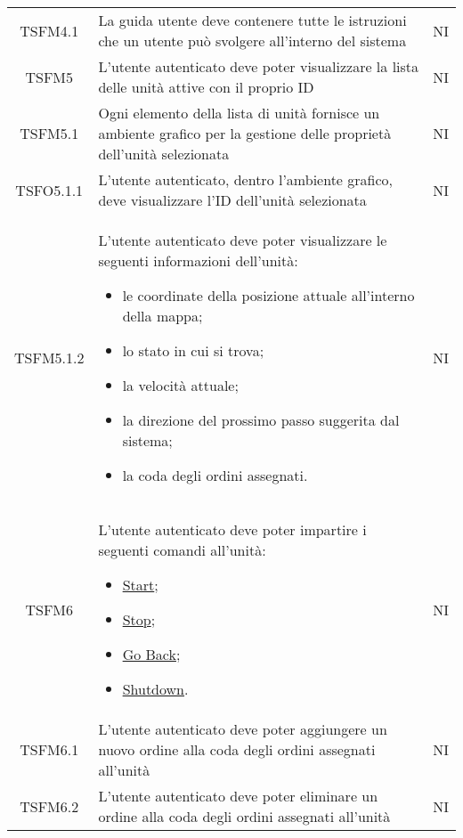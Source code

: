 \begin{longtable}[h!] { c  m{12cm} c}
		TSFM4.1 & La guida utente deve contenere tutte le istruzioni che un utente può svolgere all'interno del sistema & NI \\

		TSFM5   & L'utente autenticato deve poter visualizzare la lista delle unità attive con il proprio ID & NI \\

		TSFM5.1 & Ogni elemento della lista di unità fornisce un ambiente grafico per la gestione delle proprietà dell'unità selezionata & NI \\

		TSFO5.1.1 & L'utente autenticato, dentro l'ambiente grafico, deve visualizzare l'ID dell'unità selezionata & NI \\

		TSFM5.1.2 & L'utente autenticato deve poter visualizzare le seguenti informazioni dell'unità:
					\begin{itemize}
						\item le coordinate della posizione attuale all'interno della mappa;
						\item lo stato in cui si trova;
						\item la velocità attuale;
						\item la direzione del prossimo passo suggerita dal sistema;
						\item la coda degli ordini assegnati.
					\end{itemize}
									&NI\\

		TSFM6  & L'utente autenticato deve poter impartire i seguenti comandi all'unità:
					\begin{itemize}
						\item \underline{Start};
						\item \underline{Stop};
						\item \underline{Go Back};
						\item \underline{Shutdown}.
					\end{itemize}
									& NI \\

		TSFM6.1  & L'utente autenticato deve poter aggiungere un nuovo ordine alla coda degli ordini assegnati all'unità & NI\\

		TSFM6.2  & L'utente autenticato deve poter eliminare un ordine alla coda degli ordini assegnati all'unità & NI\\


\end{longtable}
